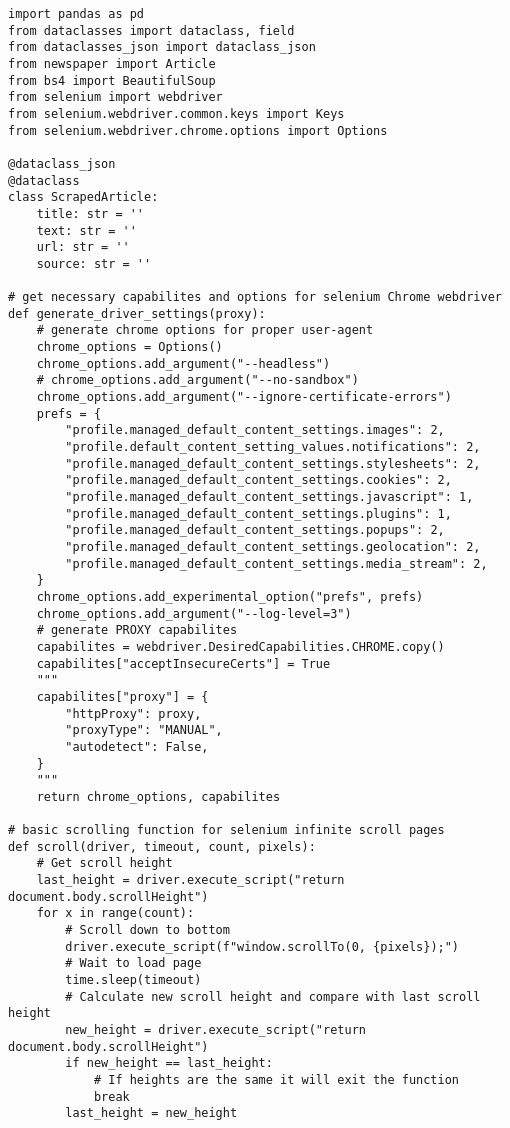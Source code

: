 \begin{verbatim}
import pandas as pd
from dataclasses import dataclass, field
from dataclasses_json import dataclass_json
from newspaper import Article
from bs4 import BeautifulSoup
from selenium import webdriver
from selenium.webdriver.common.keys import Keys
from selenium.webdriver.chrome.options import Options

@dataclass_json
@dataclass
class ScrapedArticle:
    title: str = ''
    text: str = ''
    url: str = ''
    source: str = ''

# get necessary capabilites and options for selenium Chrome webdriver
def generate_driver_settings(proxy):
    # generate chrome options for proper user-agent
    chrome_options = Options()
    chrome_options.add_argument("--headless")
    # chrome_options.add_argument("--no-sandbox")
    chrome_options.add_argument("--ignore-certificate-errors")
    prefs = {
        "profile.managed_default_content_settings.images": 2,
        "profile.default_content_setting_values.notifications": 2,
        "profile.managed_default_content_settings.stylesheets": 2,
        "profile.managed_default_content_settings.cookies": 2,
        "profile.managed_default_content_settings.javascript": 1,
        "profile.managed_default_content_settings.plugins": 1,
        "profile.managed_default_content_settings.popups": 2,
        "profile.managed_default_content_settings.geolocation": 2,
        "profile.managed_default_content_settings.media_stream": 2,
    }
    chrome_options.add_experimental_option("prefs", prefs)
    chrome_options.add_argument("--log-level=3")
    # generate PROXY capabilites
    capabilites = webdriver.DesiredCapabilities.CHROME.copy()
    capabilites["acceptInsecureCerts"] = True
    """
    capabilites["proxy"] = {
        "httpProxy": proxy,
        "proxyType": "MANUAL",
        "autodetect": False,
    }
    """
    return chrome_options, capabilites

# basic scrolling function for selenium infinite scroll pages
def scroll(driver, timeout, count, pixels):
    # Get scroll height
    last_height = driver.execute_script("return document.body.scrollHeight")
    for x in range(count):
        # Scroll down to bottom
        driver.execute_script(f"window.scrollTo(0, {pixels});")
        # Wait to load page
        time.sleep(timeout)
        # Calculate new scroll height and compare with last scroll height
        new_height = driver.execute_script("return document.body.scrollHeight")
        if new_height == last_height:
            # If heights are the same it will exit the function
            break
        last_height = new_height


\end{verbatim}
